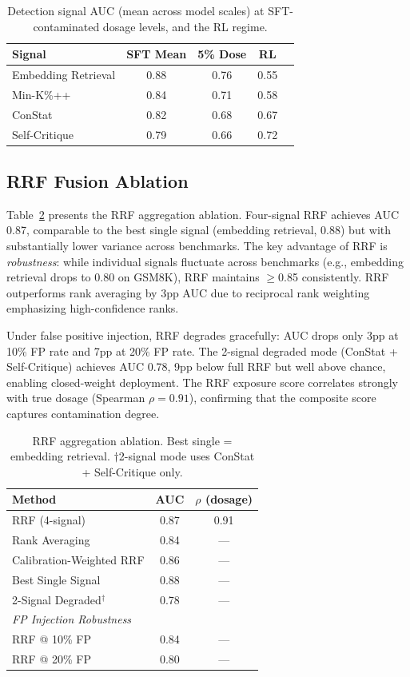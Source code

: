 \documentclass[11pt,letterpaper]{article}
\begin{document}
\begin{table}[t]
\centering
\caption{Detection signal AUC (mean across model scales) at SFT-contaminated dosage levels, and the RL regime.}
\label{tab:signals}
\begin{tabular}{lcccc}
\toprule
\textbf{Signal} & \textbf{SFT Mean} & \textbf{5\% Dose} & \textbf{RL} \\
\midrule
Embedding Retrieval & 0.88 & 0.76 & 0.55 \\
Min-K\%++ & 0.84 & 0.71 & 0.58 \\
ConStat & 0.82 & 0.68 & 0.67 \\
Self-Critique & 0.79 & 0.66 & 0.72 \\
\bottomrule
\end{tabular}
\end{table}

\subsection{RRF Fusion Ablation}

Table~\ref{tab:rrf} presents the RRF aggregation ablation.
Four-signal RRF achieves AUC 0.87, comparable to the best single signal (embedding retrieval, 0.88) but with substantially lower variance across benchmarks.
The key advantage of RRF is \emph{robustness}: while individual signals fluctuate across benchmarks (e.g., embedding retrieval drops to 0.80 on GSM8K), RRF maintains $\geq$0.85 consistently.
RRF outperforms rank averaging by 3pp AUC due to reciprocal rank weighting emphasizing high-confidence ranks.

Under false positive injection, RRF degrades gracefully: AUC drops only 3pp at 10\% FP rate and 7pp at 20\% FP rate.
The 2-signal degraded mode (ConStat + Self-Critique) achieves AUC 0.78, 9pp below full RRF but well above chance, enabling closed-weight deployment.
The RRF exposure score correlates strongly with true dosage (Spearman $\rho = 0.91$), confirming that the composite score captures contamination degree.

\begin{table}[t]
\centering
\caption{RRF aggregation ablation. Best single = embedding retrieval. $\dagger$2-signal mode uses ConStat + Self-Critique only.}
\label{tab:rrf}
\begin{tabular}{lcc}
\toprule
\textbf{Method} & \textbf{AUC} & \textbf{$\rho$ (dosage)} \\
\midrule
RRF (4-signal) & 0.87 & 0.91 \\
Rank Averaging & 0.84 & --- \\
Calibration-Weighted RRF & 0.86 & --- \\
Best Single Signal & 0.88 & --- \\
2-Signal Degraded$^\dagger$ & 0.78 & --- \\
\midrule
\multicolumn{3}{l}{\textit{FP Injection Robustness}} \\
RRF @ 10\% FP & 0.84 & --- \\
RRF @ 20\% FP & 0.80 & --- \\
\bottomrule
\end{tabular}
\end{table}
\end{document}
